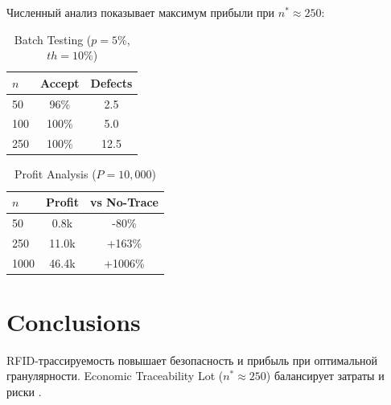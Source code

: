 \documentclass[fleqn,10pt,russian]{olplainarticle-class}
\begin{document}
Численный анализ показывает максимум прибыли при $n^*\approx250$:

\begin{table}[h]
\centering
\caption{Batch Testing ($p=5\%$, $th=10\%$)}
\begin{tabular}{|l|c|c|}
\hline
$n$ & Accept & Defects \\
\hline
50 & 96\% & 2.5 \\
100 & 100\% & 5.0 \\
250 & 100\% & 12.5 \\
\hline
\end{tabular}
\label{tab:batches}
\end{table}

\begin{table}[h]
\centering
\caption{Profit Analysis ($P=10{,}000$)}
\begin{tabular}{|l|c|c|}
\hline
$n$ & Profit & vs No-Trace \\
\hline
50 & 0.8k & -80\% \\
250 & 11.0k & +163\% \\
1000 & 46.4k & +1006\% \\
\hline
\end{tabular}
\label{tab:profit}
\end{table}

\section*{Conclusions}

RFID-трассируемость повышает безопасность и прибыль при оптимальной гранулярности. Economic Traceability Lot ($n^*\approx250$) балансирует затраты и риски \cite{BartkovaJouvet1999}.

\nocite{*}

\end{document}
